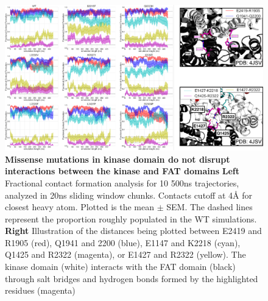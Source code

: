 \documentclass[phd,tocprelim]{cornell}
\begin{document}
\begin{landscape}
	\begin{figure}[p]
		\centering
		\includegraphics[width=1.0\linewidth]{figures/mtor-fig6.pdf}
		\caption[Missense mutations in kinase domain do not disrupt interactions between the kinase and FAT domains]{
			{\bf Missense mutations in kinase domain do not disrupt interactions between the kinase and FAT domains}
			{\bf Left} Fractional contact formation analysis for 10 500ns trajectories, analyzed in 20ns sliding window chunks. Contacts cutoff at 4Å for closest heavy atom.  Plotted is the mean $\pm$ SEM. The dashed lines represent the proportion roughly populated in the WT simulations. {\bf Right} Illustration of the distances being plotted between E2419 and R1905 (red), Q1941 and 2200 (blue), E1147 and K2218 (cyan), Q1425 and R2322 (magenta), or E1427 and R2322 (yellow). The kinase domain (white) interacts with the FAT domain (black) through salt bridges and hydrogen bonds formed by the highlighted residues (magenta) 
		}
		\label{fig:mtor-figure6}
	\end{figure}
\end{landscape}
\end{document}
